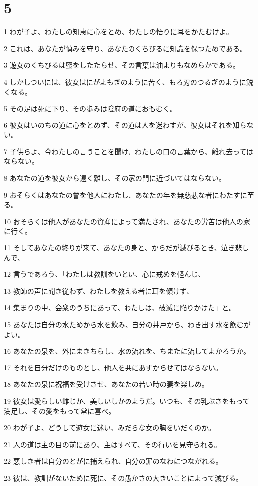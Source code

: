 \chapter{5}

\par 1 わが子よ、わたしの知恵に心をとめ、わたしの悟りに耳をかたむけよ。
\par 2 これは、あなたが慎みを守り、あなたのくちびるに知識を保つためである。
\par 3 遊女のくちびるは蜜をしたたらせ、その言葉は油よりもなめらかである。
\par 4 しかしついには、彼女はにがよもぎのように苦く、もろ刃のつるぎのように鋭くなる。
\par 5 その足は死に下り、その歩みは陰府の道におもむく。
\par 6 彼女はいのちの道に心をとめず、その道は人を迷わすが、彼女はそれを知らない。
\par 7 子供らよ、今わたしの言うことを聞け、わたしの口の言葉から、離れ去ってはならない。
\par 8 あなたの道を彼女から遠く離し、その家の門に近づいてはならない。
\par 9 おそらくはあなたの誉を他人にわたし、あなたの年を無慈悲な者にわたすに至る。
\par 10 おそらくは他人があなたの資産によって満たされ、あなたの労苦は他人の家に行く。
\par 11 そしてあなたの終りが来て、あなたの身と、からだが滅びるとき、泣き悲しんで、
\par 12 言うであろう、「わたしは教訓をいとい、心に戒めを軽んじ、
\par 13 教師の声に聞き従わず、わたしを教える者に耳を傾けず、
\par 14 集まりの中、会衆のうちにあって、わたしは、破滅に陥りかけた」と。
\par 15 あなたは自分の水ためから水を飲み、自分の井戸から、わき出す水を飲むがよい。
\par 16 あなたの泉を、外にまきちらし、水の流れを、ちまたに流してよかろうか。
\par 17 それを自分だけのものとし、他人を共にあずからせてはならない。
\par 18 あなたの泉に祝福を受けさせ、あなたの若い時の妻を楽しめ。
\par 19 彼女は愛らしい雌じか、美しいしかのようだ。いつも、その乳ぶさをもって満足し、その愛をもって常に喜べ。
\par 20 わが子よ、どうして遊女に迷い、みだらな女の胸をいだくのか。
\par 21 人の道は主の目の前にあり、主はすべて、その行いを見守られる。
\par 22 悪しき者は自分のとがに捕えられ、自分の罪のなわにつながれる。
\par 23 彼は、教訓がないために死に、その愚かさの大きいことによって滅びる。

